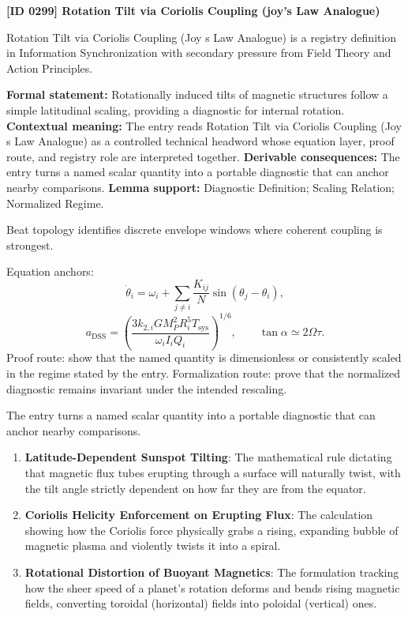 \clearpage
\noindent\textbf{[ID 0299] Rotation Tilt via Coriolis Coupling (joy's Law Analogue)}\par
\vspace{0.35em}
\begingroup\small
{}
Rotation Tilt via Coriolis Coupling (Joy s Law Analogue) is a registry definition in Information Synchronization with secondary pressure from Field Theory and Action Principles.

\begingroup\footnotesize\setlength{\emergencystretch}{3em}\sloppy
\textbf{Formal statement:} Rotationally induced tilts of magnetic structures follow a simple latitudinal scaling, providing a diagnostic for internal rotation. \textbf{Contextual meaning:} The entry reads Rotation Tilt via Coriolis Coupling (Joy s Law Analogue) as a controlled technical headword whose equation layer, proof route, and registry role are interpreted together. \textbf{Derivable consequences:} The entry turns a named scalar quantity into a portable diagnostic that can anchor nearby comparisons. \textbf{Lemma support:} Diagnostic Definition; Scaling Relation; Normalized Regime.\par
\endgroup

Beat topology identifies discrete envelope windows where coherent coupling is strongest.

Equation anchors:
\[
\dot{\theta}_i=\omega_i+\sum_{j\ne i}\frac{K_{ij}}{N}\sin(\theta_j-\theta_i),
\]
\[
a_{\mathrm{DSS}}=
\left(
\frac{3k_{2,i}GM_P^2R_i^5T_{\mathrm{sys}}}
{\omega_i I_i Q_i}
\right)^{1/6},
\qquad
\tan\alpha\simeq2\Omega\tau.
\]
Proof route: show that the named quantity is dimensionless or consistently scaled in the regime stated by the entry. Formalization route: prove that the normalized diagnostic remains invariant under the intended rescaling.

The entry turns a named scalar quantity into a portable diagnostic that can anchor nearby comparisons.
\endgroup

\begin{enumerate}[leftmargin=1.6em,itemsep=6pt,topsep=4pt]
\item \textbf{Latitude-Dependent Sunspot Tilting}: The mathematical rule dictating that magnetic flux tubes erupting through a surface will naturally twist, with the tilt angle strictly dependent on how far they are from the equator.
\item \textbf{Coriolis Helicity Enforcement on Erupting Flux}: The calculation showing how the Coriolis force physically grabs a rising, expanding bubble of magnetic plasma and violently twists it into a spiral.
\item \textbf{Rotational Distortion of Buoyant Magnetics}: The formulation tracking how the sheer speed of a planet's rotation deforms and bends rising magnetic fields, converting toroidal (horizontal) fields into poloidal (vertical) ones.
\end{enumerate}


